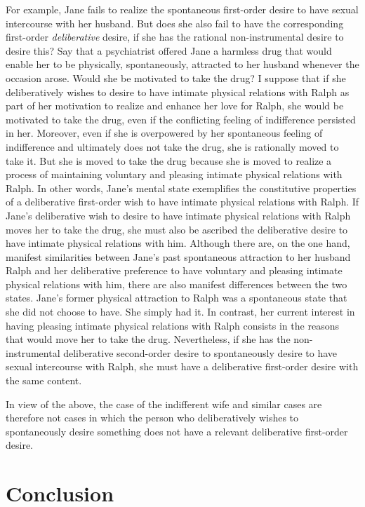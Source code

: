\documentclass[output=paper,colorlinks,citecolor=brown
]{langscibook}
\begin{document}
For example, Jane fails to realize the spontaneous first-order desire to have sexual intercourse with her husband. But does she also fail to have the corresponding first-order \textit{deliberative} desire, if she has the rational non-instrumental desire to desire this? Say that a psychiatrist offered Jane a harmless drug that would enable her to be physically, spontaneously, attracted to her husband whenever the occasion arose. Would she be motivated to take the drug? I suppose that if she deliberatively wishes to desire to have intimate physical relations with Ralph as part of her motivation to realize and enhance her love for Ralph, she would be motivated to take the drug, even if the conflicting feeling of indifference persisted in her. Moreover, even if she is overpowered by her spontaneous feeling of indifference and ultimately does not take the drug, she is rationally moved to take it. But she is moved to take the drug because she is moved to realize a process of maintaining voluntary and pleasing intimate physical relations with Ralph. In other words, Jane's mental state exemplifies the constitutive properties of a deliberative first-order wish to have intimate physical relations with Ralph. If Jane's deliberative wish to desire to have intimate physical relations with Ralph moves her to take the drug, she must also be ascribed the deliberative desire to have intimate physical relations with him. 
Although there are, on the one hand, manifest similarities between Jane's past spontaneous attraction to her husband Ralph and her deliberative preference to have voluntary and pleasing intimate physical relations with him, there are also manifest differences between the two states. Jane's former physical attraction to Ralph was a spontaneous state that she did not choose to have. She simply had it. In contrast, her current interest in having pleasing intimate physical relations with Ralph consists in the reasons that would move her to take the drug. Nevertheless, if she has the non-instrumental deliberative second-order desire to spontaneously desire to have sexual intercourse with Ralph, she must have a deliberative first-order desire with the same content. 

In view of the above, the case of the indifferent wife and similar cases are therefore not cases in which the person who deliberatively wishes to spontaneously desire something does not have a relevant deliberative first-order desire. 

\section{Conclusion}
\end{document}
